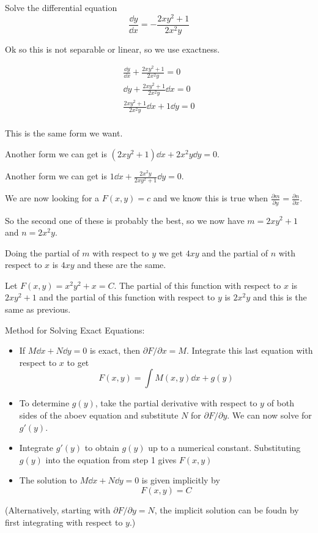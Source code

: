 \documentclass[../diffeq.tex]{subfiles}
\begin{document}
\begin{example}
    Solve the differential equation 
    \[ \frac{\dd y}{\dd x}=-\frac{2xy^2+1}{2x^2y}\]

    Ok so this is not separable or linear, so we use exactness.

    \begin{align*}
        \frac{\dd y}{\dd x}+\frac{2xy^2+1}{2x^2y}=0 \\ 
        \dd y + \frac{2xy^2+1}{2x^2y}\dd x = 0\\
        \frac{2xy^2+1}{2x^2y}\dd x + 1 \dd y = 0 \\ 
    \end{align*}

    This is the same form we want. 

    Another form we can get is $(2xy^2+1)\dd x + 2x^2y\dd y =0$.

    Another form we can get is $1\dd x+\frac{2x^2y}{2xy^2+1}\dd y =0$.

    We are now looking for a $F(x,y)=c$ and we know this is true when $\frac{\partial m}{\partial y}=\frac{\partial n}{\partial x}$.

    So the second one of these is probably the best, so we now have $m=2xy^2+1$ and $n=2x^2y$. 

    Doing the partial of $m$ with respect to $y$ we get $4xy$ and the partial of $n$ with respect to $x$ is $4xy$ and these are the same.

    Let $F(x,y)=x^2y^2+x=C$. The partial of this function with respect to $x$ is $2xy^2+1$ and the partial of this function with respect to $y$ is $2x^2y$ and this is the same as previous.
\end{example}

Method for Solving Exact Equations:
\begin{itemize}
    \item If $M\dd x+N\dd y =0$ is exact, then $\partial F/\partial x=M$. Integrate this last equation with respect to $x$ to get 
    \[ F(x,y)=\int M(x,y)\dd x + g(y)\]
    \item To determine $g(y)$, take the partial derivative with respect to $y$ of both sides of the aboev equation and substitute $N$ for $\partial F/\partial y$. We can now solve for $g'(y)$.
    \item Integrate $g'(y)$ to obtain $g(y)$ up to a numerical constant. Substituting $g(y)$ into the equation from step 1 gives $F(x,y)$
    \item The solution to $M\dd x+N\dd y = 0$ is given implicitly by 
    \[ F(x,y)=C \]
\end{itemize}
(Alternatively, starting with $\partial F/\partial y=N$, the implicit solution can be foudn by first integrating with respect to $y$.)
\end{document}
